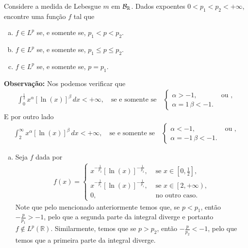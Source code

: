 \begin{homeworkProblem}[Seção 1]
  Considere a medida de Lebesgue $m$ em $\mathcal{B}_{\mathbb{R}}$. Dados expoentes $0<p_1<p_2<+\infty$, encontre uma função $f$ tal que
  \begin{enumerate}[a)]
    \item $f\in L^{p}$ se, e somente se, $p_1<p<p_2$.
    \item $f\in L^{p}$ se, e somente se, $p_1\leq p\leq p_2$.
    \item $f\in L^{p}$ se, e somente se, $p=p_1$. 
  \end{enumerate}
  \begin{solution}
    \textbf{Observação:} Nos podemos verificar que
    \begin{align*}
      \int_{0}^{\frac{1}{2}}x^{\alpha}\left[ \ln(x) \right]^{\beta}\,dx<+\infty,\quad\text{se e somente se}\quad \begin{cases}
        \alpha>-1, &\text{ ou }  \text{,} \\
        \alpha=1\,\beta<-1.
      \end{cases}
    \end{align*}
    E por outro lado
    \begin{align*}
      \int_{2}^{\infty}x^{\alpha}\left[ \ln(x) \right]^{\beta}\,dx<+\infty,\quad\text{se e somente se}\quad \begin{cases}
        \alpha<-1, &\text{ ou }  \text{,} \\
        \alpha=-1\,\beta<-1.
      \end{cases}
    \end{align*}
  \begin{enumerate}[a)]
    \item Seja $f$ dada por
      \begin{align*}
        f(x)=\begin{cases}
          x^{-\frac{1}{p_2}}\left[ \ln(x) \right]^{-\frac{1}{p_2}}, &\text{ se } x\in\left[ 0,\frac{1}{2} \right] \text{,} \\
          x^{-\frac{1}{p_1}}\left[ \ln(x) \right]^{-\frac{1}{p_1}}, &\text{ se } x\in\left[ 2,+\infty \right),\\
          0,&\text{ no outro caso}.
        \end{cases}
      \end{align*}
      Note que pelo mencionado anteriormente temos que, se $p<p_1$, então $-\frac{p}{p_1}>-1$, pelo que a segunda parte da integral diverge e portanto $f\notin L^{p}(\mathbb{R})$. Similarmente, temos que se $p>p_2$, então $-\frac{p}{p_2}<-1$, pelo que temos que a primeira parte da integral diverge.\\

\end{enumerate}
\end{solution}
\end{homeworkProblem}
